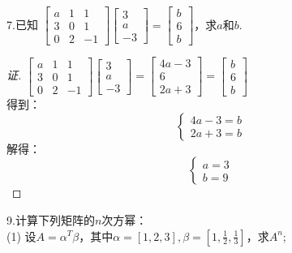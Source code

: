 \documentclass[10pt,a4paper]{report}
\begin{document}
\noindent 7.已知
$
\left[
\begin{matrix}
a & 1 & 1 \\
3 & 0 & 1 \\
0 & 2 & -1 
\end{matrix}
\right]
\left[
\begin{matrix}
3 \\
a \\
-3
\end{matrix}
\right] = 
\left[
\begin{matrix}
b \\
6 \\
b
\end{matrix}
\right] 
$，求$a$和$b$.
\begin{proof}[证]
	$
	\left[
	\begin{matrix}
		a & 1 & 1 \\
		3 & 0 & 1 \\
		0 & 2 & -1 
	\end{matrix}
	\right]
	\left[
	\begin{matrix}
		3 \\
		a \\
		-3
	\end{matrix}
	\right] =
	\left[
	\begin{matrix}
	4a-3 \\
	6 \\
	2a+3
	\end{matrix}
	\right] = 
	\left[
	\begin{matrix}
	b \\
	6 \\
	b
	\end{matrix}
	\right] 
	$\\
	得到：\\
	$$
	\left\{
	\begin{aligned}
	4a-3=b \\
	2a+3=b 
	\end{aligned}
	\right.
	$$
	解得：\\
	$$
	\left\{
	\begin{aligned}
	a=3 \\
	b=9 
	\end{aligned}
	\right.
	$$
\end{proof}
\noindent 9.计算下列矩阵的$n$次方幂：\\
\noindent (1) 设$A = \alpha^{T} \beta$，其中$\alpha = [1, 2, 3], \beta = [1,\frac{1}{2},\frac{1}{3}]$，求$A^{n}$;
\end{document}
